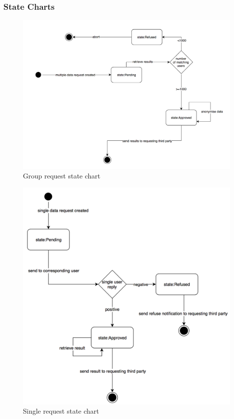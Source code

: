 \documentclass[titlepage]{article}
\begin{document}
		\subsubsection{State Charts}
		\begin{figure}[ht]
			\center
  			\includegraphics[width=\textwidth]{Diagrammi/groupStateChart.png}
  			\caption{ Group request state chart}
 			\label{fig:groupStateChart}
		\end{figure}
		\begin{figure}[ht]
			\center
  			\includegraphics[width=\textwidth]{Diagrammi/singleStateChart.png}
  			\caption{ Single request state chart}
 			\label{fig:singleStateChart}
		\end{figure}
\end{document}
